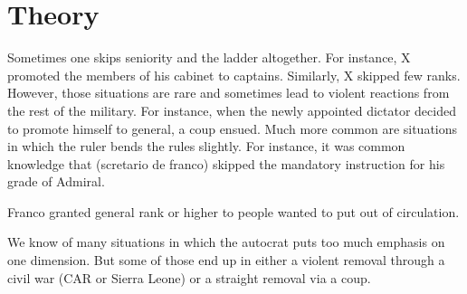 \section{Theory}

Sometimes one skips seniority and the ladder altogether. For instance, X
promoted the members of his cabinet to captains. Similarly, X skipped few ranks.
However, those situations are rare and sometimes lead to violent reactions from
the rest of the military. For instance, when the newly appointed dictator
decided to promote himself to general, a coup ensued. Much more common are
situations in which the ruler bends the rules slightly. For instance, it was
common knowledge that (scretario de franco) skipped the mandatory instruction
for his grade of Admiral. 

Franco granted general rank or higher to people wanted to put out of circulation.

We know of many situations in which the autocrat puts too much emphasis
on one dimension. But some of those end up in either a violent removal through a
civil war (CAR or Sierra Leone) or a straight removal via a coup.
